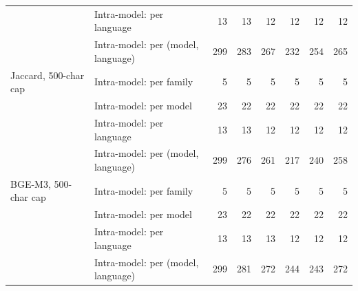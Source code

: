 \begin{table}[t]
\begin{tabular}{llrrrrrr}
 & Intra-model: per language & 13 & 13 & 12 & 12 & 12 & 12 \\
 & Intra-model: per (model, language) & 299 & 283 & 267 & 232 & 254 & 265 \\
\midrule
Jaccard, 500-char cap & Intra-model: per family & 5 & 5 & 5 & 5 & 5 & 5 \\
 & Intra-model: per model & 23 & 22 & 22 & 22 & 22 & 22 \\
 & Intra-model: per language & 13 & 13 & 12 & 12 & 12 & 12 \\
 & Intra-model: per (model, language) & 299 & 276 & 261 & 217 & 240 & 258 \\
\midrule
BGE-M3, 500-char cap & Intra-model: per family & 5 & 5 & 5 & 5 & 5 & 5 \\
 & Intra-model: per model & 23 & 22 & 22 & 22 & 22 & 22 \\
 & Intra-model: per language & 13 & 13 & 13 & 12 & 12 & 12 \\
 & Intra-model: per (model, language) & 299 & 281 & 272 & 244 & 243 & 272 \\
\bottomrule
\end{tabular}
\label{tab:prompt_tests}
\end{table}
